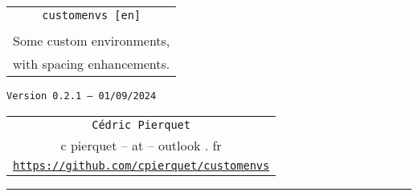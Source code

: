 \documentclass[english,11pt,a4paper]{article}
\def\TPversion{0.2.1}
\def\TPdate{01/09/2024}
\begin{document}
\pagestyle{fancy}

\thispagestyle{empty}

\begin{center}
	\begin{minipage}{0.75\linewidth}
	\begin{tcolorbox}[colframe=yellow,colback=yellow!15]
		\begin{center}
			\renewcommand\arraystretch{1.25}
			\begin{tabular}{c}
				{\Huge \texttt{customenvs [en]}}\\
				\\
				{\Large Some custom environments,} \\
				{\Large with spacing enhancements.} \\
			\end{tabular}
			\renewcommand\arraystretch{1}
			
			\medskip
			
			{\small \texttt{Version \TPversion{} -- \TPdate}}
		\end{center}
	\end{tcolorbox}
\end{minipage}
\end{center}

\vspace*{1mm}

\begin{center}
	\begin{tabular}{c}
	\texttt{Cédric Pierquet}\\
	{\ttfamily c pierquet -- at -- outlook . fr}\\
	\texttt{\url{https://github.com/cpierquet/customenvs}}
\end{tabular}
\end{center}

\vspace*{5mm}

%
%
%
%
%

\hrule


\hypertarget{matoc}{}

\tableofcontents

\vspace*{5mm}
\end{document}
